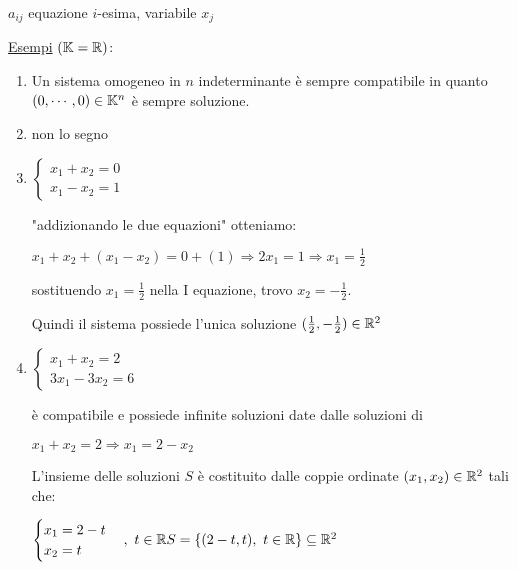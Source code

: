 \documentclass{article}
\begin{document}
$a_{ij}$ equazione $i$-esima, variabile $x_j$




\ul{Esempi} $(\mathbb{K}=\mathbb{R})$:
\begin{enumerate}
	\item Un sistema omogeneo in $n$ indeterminante è sempre compatibile in quanto $(0,\cdots,0)\in\mathbb{K}^n$ è sempre soluzione.
	\item non lo segno
	\item $\begin{cases}x_1+x_2=0\\x_1-x_2=1\end{cases}$
	
    "addizionando le due equazioni" otteniamo:
	
    $x_1+x_2+(x_1-x_2)=0+(1)\Rightarrow2x_1=1\Rightarrow x_1=\frac{1}{2}$
	
    sostituendo $x_1=\frac{1}{2}$ nella I equazione, trovo $x_2=-\frac{1}{2}$.

    Quindi il sistema possiede l'unica soluzione $(\frac{1}{2},-\frac{1}{2})\in\mathbb{R}^2$
	\item $\begin{cases}x_1+x_2=2\\3x_1-3x_2=6\end{cases}$
	
    è compatibile e possiede infinite soluzioni date dalle soluzioni di
	
    $x_1+x_2=2\Rightarrow x_1=2-x_2$
	
    L'insieme delle soluzioni $S$ è costituito dalle coppie ordinate $(x_1,x_2)\in\mathbb{R}^2$ tali che:
	
    $\begin{cases}x_1=2-t\\x_2=t\end{cases},\ t\in\R\\S=\{(2-t,t),\ t\in\R\}\subseteq\R^2$
\end{enumerate}
\end{document}
